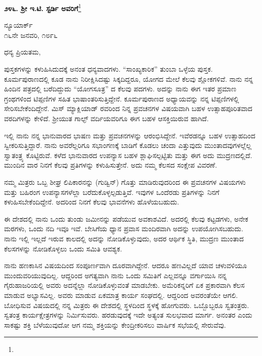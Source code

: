 \begin{center}
\textbf{೨೪೬. ಶ‍್ರೀ ಇ.ಟಿ. ಸ್ಟರ್ಡಿ ಅವರಿಗೆ}\footnote{}
\end{center}
\vspace{-0.6cm}

\begin{flushright}
ನ್ಯೂಯಾರ್ಕ್\\೧೬ನೇ ಜನವರಿ, ೧೮೯೬
\end{flushright}
\vspace{-0.6cm}

\noindent
ಧನ್ಯ ಪ್ರಿಯತಮ,

ಪುಸ್ತಕಗಳನ್ನು ಕಳುಹಿಸಿದುದಕ್ಕೆ ಅನಂತ ಧನ್ಯವಾದಗಳು. “ಸಾಂಖ್ಯಕಾರಿಕ” ತುಂಬಾ ಒಳ್ಳೆಯ ಪುಸ್ತಕ. ಕೂರ್ಮಪುರಾಣದಲ್ಲಿ ಕೂಡ ನಾನು ನಿರೀಕ್ಷಿಸಿದಷ್ಟು ಸಿಕ್ಕದಿದ್ದರೂ, ಯೋಗದ ಮೇಲೆ ಕೆಲವು ಶ್ಲೋಕಗಳಿವೆ. ನಾನು ನನ್ನ ಹಿಂದಿನ ಪತ್ರದಲ್ಲಿ ಬರೆದಿದ್ದುದು “ಯೋಗಸೂತ್ರ” ದ ಕೆಲವು ಪದಗಳು. ಅದನ್ನು ನಾನು ಈಗ ಇತರ ಪ್ರಮಾಣ ಗ್ರಂಥಗಳಿಂದ ಟಿಪ್ಪಣಿಗಳ ಸಹಿತ ಭಾಷಾಂತರಿಸುತ್ತಿದ್ದೇನೆ. ಕೂರ್ಮಪುರಾಣದ ಅಧ್ಯಾಯವನ್ನು ನನ್ನ ಟಿಪ್ಪಣಿಗಳಲ್ಲಿ ಸೇರಿಸಬೇಕೆಂದಿದ್ದೇನೆ. ಮಿಸ್ ಮ್ಯಾಕ್ಲಿಯಾಡ್ ರವರಿಂದ ನಿನ್ನ ಪ್ರವಚನಗಳ ವಿಷಯವಾಗಿ ಬಹಳ ಉತ್ಸಾಹಪೂರಿತವಾದ ವರದಿಗಳನ್ನು ಕೇಳಿದೆ. ಶ‍್ರೀಯುತ ಗಾಲ್ಫ್ ವರ್ದಿಯವರಿಗೂ ಈಗ ಬಹಳ ಆಸಕ್ತಿಯಿರುವ ಹಾಗಿದೆ.

ಇಲ್ಲಿ ನಾನು ನನ್ನ ಭಾನುವಾರದ ಭಾಷಣ ಮತ್ತು ಪ್ರವಚನಗಳನ್ನು ಆರಂಭಿಸಿದ್ದೇನೆ. ಇವೆರಡನ್ನೂ ಬಹಳ ಉತ್ಸಾಹದಿಂದ ಸ್ವೀಕರಿಸುತ್ತಿದ್ದಾರೆ. ನಾನು ಅವರೆಲ್ಲರಿಗೂ ಸಭಾಂಗಣಕ್ಕೆ ಬಾಡಿಗೆ ಕೊಡಲು ಚಂದಾ ಎತ್ತುವುದು ಮುಂತಾದವುಗಳಲ್ಲೆಲ್ಲ ಸ್ವಾತಂತ್ರ್ಯ ಕೊಟ್ಟಿರುವೆ. ಕಳೆದ ಭಾನುವಾರದ ಉಪನ್ಯಾಸ ಬಹಳ ಶ್ಲಾಘಿಸಲ್ಪಟ್ಟಿತು ಮತ್ತು ಈಗ ಅದು ಮುದ್ರಣದಲ್ಲಿದೆ. ಮುಂದಿನ ವಾರ ನಿನಗೆ ಕೆಲವು ಪ್ರತಿಗಳನ್ನು ಕಳುಹಿಸುತ್ತೇನೆ. ಅದು ನಮ್ಮ ಕೆಲಸದ ಸಂಕ್ಷೇಪ ವಿವರಣೆ.

ನಮ್ಮ ಮಿತ್ರರು ಒಬ್ಬ ಶೀಘ್ರ ಲಿಪಿಕಾರನನ್ನು (ಗುಡ್ವಿನ್) ಗೊತ್ತು ಮಾಡಿರುವುದರಿಂದ ಈ ಪ್ರವಚನಗಳ ವಿಷಯಗಳು ಮತ್ತು ಬಹಿರಂಗ ಉಪನ್ಯಾಸಗಳೆಲ್ಲಾ ಬರೆದುಕೊಳ್ಳಲ್ಪಡುತ್ತಿವೆ. ಇವುಗಳ ಒಂದೆರಡು ಪ್ರತಿಗಳನ್ನು ನಿನಗೆ ಕಳುಹಿಸಬೇಕೆಂದಿದ್ದೇನೆ. ಅದರಿಂದ ನಿನಗೆ ಕೆಲವು ಭಾವನೆಗಳು ಹೊಳೆಯಬಹುದು.

{\fontsize{12.6}{12}\selectfont{
ನಿನ್ನಂತಹ ಒಬ್ಬ ಬಲಾಢ್ಯ ವ್ಯಕ್ತಿ, ಬುದ್ಧಿ, ಕಾರ್ಯದಕ್ಷತೆ ಮತ್ತು ಪ್ರೀತಿಯಿಂದೊಡಗೂಡಿದ ವ್ಯಕ್ತಿ, ನನಗೆ ಈಗ ಅಗತ್ಯವಾಗಿ ಬೇಕಾಗಿದೆ. ಸಾರ್ವತ್ರಿಕ ವಿದ್ಯಾಭ್ಯಾಸ ಪಡೆದಿರುವ ಈ ಜನಾಂಗದಲ್ಲಿ ಪ್ರತಿಯೊಬ್ಬರೂ ಸಾಮಾನ್ಯ ಯೋಗ್ಯತೆಯುಳ್ಳವರೆಂಬಂತೆ ಕಾಣಿಸುವರು. ಶಕ್ತಿಯುತರಾದ ಕೆಲವರು ಸತತವಾಗಿ ಹಣ ಸಂಪಾದಿಸುವುದರಲ್ಲಿ ಮುಳುಗಿ ಹೋಗಿರುವರು.}}

ಈ ದೇಶದಲ್ಲಿ ನಾನು ಒಂದು ತುಂಡು ಜಮೀನನ್ನು ಪಡೆಯುವ ಅವಕಾಶವಿದೆ. ಅದರಲ್ಲಿ ಕೆಲವು ಕಟ್ಟಡಗಳು, ಅನೇಕ ಮರಗಳು, ಒಂದು ನದಿ ಇವೂ ಇವೆ. ಬೇಸಿಗೆಯ ಧ್ಯಾನ ಪ್ರವಾಸ ಮಂದಿರವಾಗಿ ಅದನ್ನು ಉಪಯೋಗಿಸಬಹುದು. ನಾನು ಇಲ್ಲಿ ಇಲ್ಲದೆ ಇರುವ ಕಾಲದಲ್ಲಿ ಅದನ್ನು ನೋಡಿಕೊಳ್ಳುವುದು, ಅದರ ಆರ್ಥಿಕ ಸ್ಥಿತಿ, ಮುದ್ರಣ ಮುಂತಾದ ಕೆಲಸಗಳನ್ನು ನೋಡಿಕೊಳ್ಳಲು ಒಂದು ಸಮಿತಿ ಆವಶ್ಯಕ.

ನಾನು ಹಣಕಾಸಿನ ವಿಷಯದಿಂದ ಸಂಪೂರ್ಣವಾಗಿ ದೂರವಾಗಿದ್ದೇನೆ. ಆದರೂ ಹಣವಿಲ್ಲದೆ ಯಾವ ಚಳುವಳಿಯೂ ಮುಂದುವರಿಯುವುದಿಲ್ಲ. ಆದ್ದರಿಂದ ಅಗತ್ಯವಾಗಿ ನಾನು ಒಂದು ಸಮಿತಿಗೆ ಎಲ್ಲವನ್ನೂ ವರ್ಗಾಯಿಸಿ ನನ್ನ ಗೈರುಹಾಜರಿಯಲ್ಲಿ ಅವರು ಅದನ್ನೆಲ್ಲಾ ನೋಡಿಕೊಳ್ಳುವಂತೆ ಮಾಡಬೇಕು. ಅಮೆರಿಕನ್ನರಿಗೆ ಏಕ ಪ್ರಕಾರವಾಗಿ ಕೆಲಸ ಮಾಡುವ ಅಭ್ಯಾಸವಿಲ್ಲ. ಅವರು ಮಾಡುವ ಏಕಮಾತ್ರ ಕಾರ್ಯ ಸಂಘದಲ್ಲಿ. ಆದ್ದರಿಂದ ಅವರಂತೆಯೇ ಆಗಲಿ. ಬೋಧಿಸುವ ವಿಷಯದಲ್ಲಿ ನನ್ನ ಮಿತ್ರರು ಈ ದೇಶದಲ್ಲಿ ಸ್ಥಳದಿಂದ ಸ್ಥಳಕ್ಕೆ ಹೋಗುವರು. ಒಬ್ಬೊಬ್ಬರೂ ಸ್ವತಂತ್ರರು. ಸ್ವತಂತ್ರ ಕಾರ್ಯಕ್ಷೇತ್ರಗಳನ್ನು ನಿರ್ಮಿಸುವರು. ಹರಡುವುದಕ್ಕೆ ಇದೇ ಅತ್ಯಂತ ಸುಲಭವಾದ ಮಾರ್ಗ. ಅನಂತರ ಎಂದು ಸಾಕಷ್ಟು ಶಕ್ತಿ ಬೆಳೆಯುವುದೋ ಆಗ ನಮ್ಮ ಶಕ್ತಿಯನ್ನು ಕೇಂದ್ರೀಕರಿಸಲು ವಾರ್ಷಿಕ ಸಭೆಯಲ್ಲಿ ಸೇರುವೆವು.

